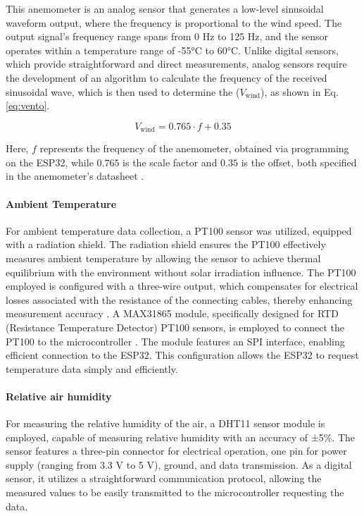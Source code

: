 This anemometer is an analog sensor that generates a low-level sinusoidal waveform output, where the frequency is proportional to the wind speed. The output signal's frequency range spans from 0 Hz to 125 Hz, and the sensor operates within a temperature range of -55°C to 60°C. Unlike digital sensors, which provide straightforward and direct measurements, analog sensors require the development of an algorithm to calculate the frequency of the received sinusoidal wave, which is then used to determine the (\(V_{\text{wind}}\)),  as shown in Eq. \ref{eq:vento}.

\begin{equation}
    V_{\text{wind}} = 0.765 \cdot f + 0.35
    \label{eq:vento}
\end{equation}

Here, \(f\) represents the frequency of the anemometer, obtained via programming on the ESP32, while  \(0.765\)  is the scale factor and \(0.35\) is the offset, both specified in the anemometer's datasheet \cite{NRGSystems2019}.
%


\paragraph{Ambient Temperature}

For ambient temperature data collection, a PT100 sensor was utilized, equipped with a radiation shield. The radiation shield ensures the PT100 effectively measures ambient temperature by allowing the sensor to achieve thermal equilibrium with the environment without solar irradiation influence. The PT100 employed is configured with a three-wire output, which compensates for electrical losses associated with the resistance of the connecting cables, thereby enhancing measurement accuracy \cite{OmegaEngineering2015}. A MAX31865 module, specifically designed for RTD (Resistance Temperature Detector) PT100 sensors, is employed to connect the PT100 to the microcontroller \cite{MaximIntegrated2023}. The module features an SPI interface, enabling efficient connection to the ESP32. This configuration allows the ESP32 to request temperature data simply and efficiently.

\paragraph{Relative air humidity}

For measuring the relative humidity of the air, a DHT11 sensor module is employed, capable of measuring relative humidity with an accuracy of ±5\%. The sensor features a three-pin connector for electrical operation, one pin for power supply (ranging from 3.3 V to 5 V), ground, and data transmission. As a digital sensor, it utilizes a straightforward communication protocol, allowing the measured values to be easily transmitted to the microcontroller requesting the data.

